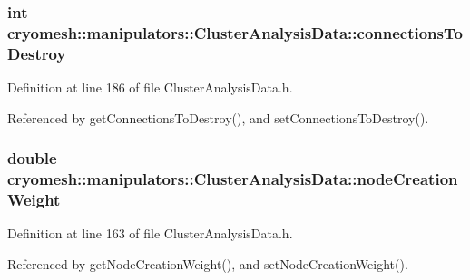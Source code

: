 \hypertarget{classcryomesh_1_1manipulators_1_1ClusterAnalysisData_a303e9f1b0de641d8c3f79ff4ad05a9a5}{
\subsubsection[{connections\-To\-Destroy}]{\setlength{\rightskip}{0pt plus 5cm}int {\bf cryomesh\-::manipulators\-::\-Cluster\-Analysis\-Data\-::connections\-To\-Destroy}}}\label{classcryomesh_1_1manipulators_1_1ClusterAnalysisData_a303e9f1b0de641d8c3f79ff4ad05a9a5}


\-Definition at line 186 of file \-Cluster\-Analysis\-Data.\-h.



\-Referenced by get\-Connections\-To\-Destroy(), and set\-Connections\-To\-Destroy().

\hypertarget{classcryomesh_1_1manipulators_1_1ClusterAnalysisData_a135e912ae399505480429e488a163d75}{
\subsubsection[{node\-Creation\-Weight}]{\setlength{\rightskip}{0pt plus 5cm}double {\bf cryomesh\-::manipulators\-::\-Cluster\-Analysis\-Data\-::node\-Creation\-Weight}}}\label{classcryomesh_1_1manipulators_1_1ClusterAnalysisData_a135e912ae399505480429e488a163d75}


\-Definition at line 163 of file \-Cluster\-Analysis\-Data.\-h.



\-Referenced by get\-Node\-Creation\-Weight(), and set\-Node\-Creation\-Weight().

